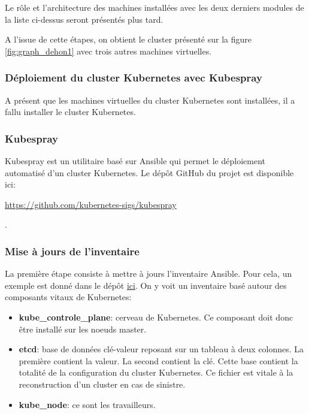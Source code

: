 \documentclass[12pt]{article}
\begin{document}
Le rôle et l'architecture des machines installées avec les deux derniers modules de la liste ci-dessus seront présentés plus tard.

A l'issue de cette étapes, on obtient le \gls{cluster} présenté sur la figure \ref{fig:graph_dehon1} avec trois autres machines virtuelles.

\subsubsection{Déploiement du cluster Kubernetes avec Kubespray}
A présent que les machines virtuelles du \gls{cluster} \gls{Kubernetes} sont installées, il a fallu installer le \gls{cluster} \gls{Kubernetes}.

\subsubsection{Kubespray}
\gls{Kubespray} est un utilitaire basé sur \gls{Ansible} qui permet le déploiement automatisé d'un \gls{cluster} \gls{Kubernetes}.
Le dépôt GitHub du projet est disponible ici: \\ \begin{hilite}\url{https://github.com/kubernetes-sigs/kubespray}\end{hilite}.

\subsubsection{Mise à jours de l'inventaire}
La première étape consiste à mettre à jours l'inventaire \gls{Ansible}.
Pour cela, un exemple est donné dans le dépôt \href{https://github.com/kubernetes-sigs/kubespray/blob/master/inventory/sample/inventory.ini}{ici}.
On y voit un inventaire basé autour des composants vitaux de \gls{Kubernetes}:
\begin{itemize}
    \item \textbf{kube\_controle\_plane}: cerveau de \gls{Kubernetes}.
    Ce composant doit donc être installé sur les noeuds master.
    \item \textbf{etcd}: base de données clé-valeur reposant sur un tableau à deux colonnes.
    La première contient la valeur.
    La second contient la clé.
    Cette base contient la totalité de la configuration du \gls{cluster} \gls{Kubernetes}.
    Ce fichier est vitale à la reconstruction d'un \gls{cluster} en cas de sinistre.
    \item \textbf{kube\_node}: ce sont les travailleurs.
\end{itemize}
\end{document}
